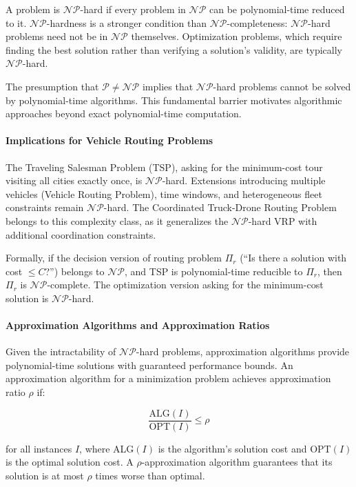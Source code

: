 A problem is $\mathcal{NP}$-hard if every problem in $\mathcal{NP}$ can be polynomial-time reduced to it. $\mathcal{NP}$-hardness is a stronger condition than $\mathcal{NP}$-completeness: $\mathcal{NP}$-hard problems need not be in $\mathcal{NP}$ themselves. Optimization problems, which require finding the best solution rather than verifying a solution's validity, are typically $\mathcal{NP}$-hard.

The presumption that $\mathcal{P} \neq \mathcal{NP}$ implies that $\mathcal{NP}$-hard problems cannot be solved by polynomial-time algorithms. This fundamental barrier motivates algorithmic approaches beyond exact polynomial-time computation.

\paragraph{Implications for Vehicle Routing Problems}

The Traveling Salesman Problem (TSP), asking for the minimum-cost tour visiting all cities exactly once, is $\mathcal{NP}$-hard. Extensions introducing multiple vehicles (Vehicle Routing Problem), time windows, and heterogeneous fleet constraints remain $\mathcal{NP}$-hard. The Coordinated Truck-Drone Routing Problem belongs to this complexity class, as it generalizes the $\mathcal{NP}$-hard VRP with additional coordination constraints.

Formally, if the decision version of routing problem $\Pi_r$ (``Is there a solution with cost $\leq C$?'') belongs to $\mathcal{NP}$, and TSP is polynomial-time reducible to $\Pi_r$, then $\Pi_r$ is $\mathcal{NP}$-complete. The optimization version asking for the minimum-cost solution is $\mathcal{NP}$-hard.

\paragraph{Approximation Algorithms and Approximation Ratios}

Given the intractability of $\mathcal{NP}$-hard problems, approximation algorithms provide polynomial-time solutions with guaranteed performance bounds. An approximation algorithm for a minimization problem achieves approximation ratio $\rho$ if:

\begin{equation}
\frac{\text{ALG}(I)}{\text{OPT}(I)} \leq \rho
\end{equation}

for all instances $I$, where ALG$(I)$ is the algorithm's solution cost and OPT$(I)$ is the optimal solution cost. A $\rho$-approximation algorithm guarantees that its solution is at most $\rho$ times worse than optimal.

